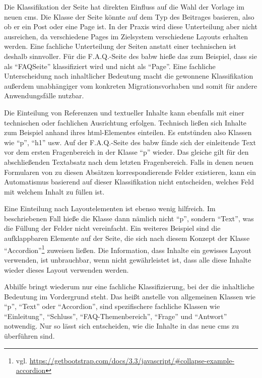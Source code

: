         Die Klassifikation der Seite hat direkten Einfluss auf die Wahl der Vorlage im neuen \gls{cms}.
        Die Klasse der Seite könnte auf dem Typ des Beitrages basieren,
        also ob er ein Post oder eine Page ist.
        In der Praxis wird diese Unterteilung aber nicht ausreichen,
        da verschiedene Pages im Zielsystem verschiedene Layouts erhalten werden.
        Eine fachliche Unterteilung der Seiten anstatt einer technischen ist deshalb sinnvoller.
        Für die F.A.Q.-Seite des \gls{babw} hieße das zum Beispiel,
        dass sie als "`FAQSeite"' klassifiziert wird und nicht als "`Page"'.
        Eine fachliche Unterscheidung nach inhaltlicher Bedeutung macht die
        gewonnene Klassifikation außerdem unabhängiger vom konkreten
        Migrationsvorhaben und somit für andere Anwendungsfälle nutzbar.

        Die Einteilung von Referenzen und textueller Inhalte kann ebenfalls
        mit einer technischen oder fachlichen Ausrichtung erfolgen.
        Technisch ließen sich Inhalte zum Beispiel anhand ihres \gls{html}-Elementes einteilen.
        Es entstünden also Klassen wie "`p"', "`h1"' usw.
        Auf der F.A.Q.-Seite des \gls{babw} fände sich der einleitende Text vor dem
        ersten Fragenbereich in der Klasse "`p"' wieder.
        Das gleiche gilt für den abschließenden Textabsatz nach dem letzten Fragenbereich.
        Falls in denen neuen Formularen von {\imperia} zu diesen Absätzen
        korrespondierende Felder existieren, kann ein Automatismus basierend auf dieser
        Klassifikation nicht entscheiden, welches Feld mit welchem Inhalt zu füllen ist.
        
        Eine Einteilung nach Layoutelementen ist ebenso wenig hilfreich.
        Im beschriebenen Fall hieße die Klasse dann nämlich nicht "`p"',
        sondern "`Text"', was die Füllung der Felder nicht vereinfacht.
        Ein weiteres Beispiel sind die aufklappbaren Elemente auf der Seite,
        die sich nach diesem Konzept
        der Klasse "`Accordion"'\footnote{vgl. \url{https://getbootstrap.com/docs/3.3/javascript/\#collapse-example-accordion}}
        zuweisen ließen.
        Die Information, dass Inhalte ein gewisses Layout verwenden,
        ist unbrauchbar, wenn nicht gewährleistet ist,
        dass alle diese Inhalte wieder dieses Layout verwenden werden.

        Abhilfe bringt wiederum nur eine fachliche Klassifizierung,
        bei der die inhaltliche Bedeutung im Vordergrund steht.
        Das heißt anstelle von allgemeinen Klassen wie "`p"', "`Text"'
        oder "`Accordion"', sind spezifischere fachliche Klassen wie
        "`Einleitung"', "`Schluss"', "`FAQ-Themenbereich"', "`Frage"' und "`Antwort"'
        notwendig.
        Nur so lässt sich entscheiden, wie die Inhalte in das neue \gls{cms}
        zu überführen sind.

